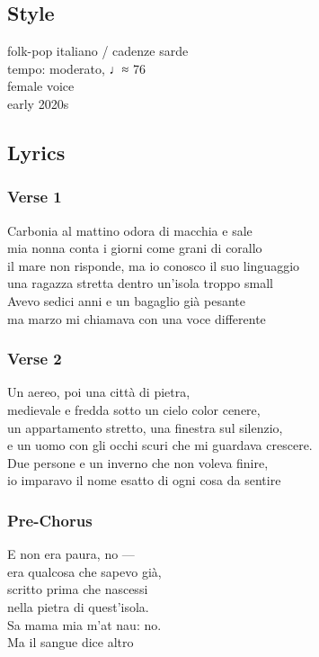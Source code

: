 \subsection{Style}\label{style-9}

folk-pop italiano / cadenze sarde\\
tempo: moderato, ♩≈ 76\\
female voice\\
early 2020s

\subsection{Lyrics}\label{lyrics-9}

\subsubsection{Verse 1}\label{verse-1-5}

Carbonia al mattino odora di macchia e sale\\
mia nonna conta i giorni come grani di corallo\\
il mare non risponde, ma io conosco il suo linguaggio\\
una ragazza stretta dentro un'isola troppo small\\
Avevo sedici anni e un bagaglio già pesante\\
ma marzo mi chiamava con una voce differente

\subsubsection{Verse 2}\label{verse-2-5}

Un aereo, poi una città di pietra,\\
medievale e fredda sotto un cielo color cenere,\\
un appartamento stretto, una finestra sul silenzio,\\
e un uomo con gli occhi scuri che mi guardava crescere.\\
Due persone e un inverno che non voleva finire,\\
io imparavo il nome esatto di ogni cosa da sentire

\subsubsection{Pre-Chorus}\label{pre-chorus-8}

E non era paura, no ---\\
era qualcosa che sapevo già,\\
scritto prima che nascessi\\
nella pietra di quest'isola.\\
Sa mama mia m'at nau: no.\\
Ma il sangue dice altro

